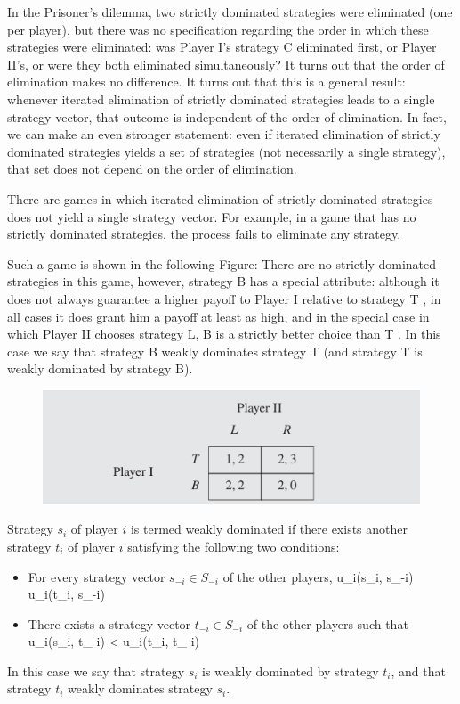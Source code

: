 In the Prisoner's dilemma, two strictly dominated strategies were eliminated (one per player), but there was no specification regarding the order in which these strategies were eliminated: was Player I’s strategy C eliminated first, or Player II’s, or were they both eliminated simultaneously? It turns out that the order of elimination makes no difference. It turns out that this is a general result: whenever iterated elimination of strictly dominated strategies leads to a single strategy vector, that outcome is independent of the order of elimination. In fact, we can make an even stronger statement: even if iterated elimination of strictly dominated strategies yields a set of strategies (not necessarily a single strategy), that set does not depend on the order of elimination.

There are games in which iterated elimination of strictly dominated strategies does not yield a single strategy vector. For example, in a game that has no strictly dominated strategies, the process fails to eliminate any strategy.

Such a game is shown in the following Figure: There are no strictly dominated strategies in this game, however, strategy B has a special attribute: although it does not always guarantee a higher payoff to Player I relative to strategy T , in all cases it does grant him a payoff at least as high, and in the special case in which Player II chooses strategy L, B is a strictly better choice than T . In this case we say that strategy B weakly dominates strategy T (and strategy T is weakly dominated by strategy B).

\begin{figure}[H]
    \centering
    \includegraphics[scale=0.75]{images/2023-10-10-game_theory_21.png}
\end{figure}

\begin{definition}
Strategy $s_i$ of player $i$ is termed weakly dominated if there exists another strategy $t_i$ of player $i$ satisfying the following two conditions: 

\begin{itemize}
	\item For every strategy vector $s_{-i} \in S_{-i}$ of the other players,
	\bee
	u_i(s_i, s_{-i}) \leq u_i(t_i, s_{-i})
	\eee

	\item There exists a strategy vector $t_{-i} \in S_{-i}$ of the other players such that
	\bee
	u_i(s_i, t_{-i}) < u_i(t_i, t_{-i})
	\eee
\end{itemize}

In this case we say that strategy $s_i$ is weakly dominated by strategy $t_i$, and that strategy $t_i$ weakly dominates strategy $s_i$.
\end{definition}

